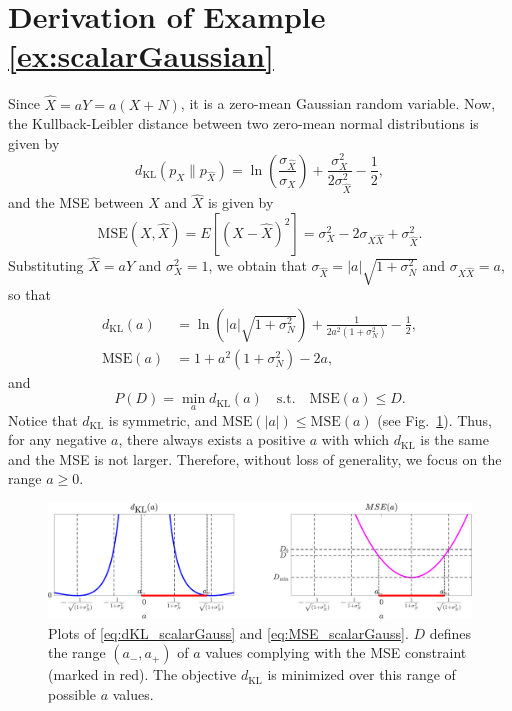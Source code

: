 \section{Derivation of Example \ref{ex:scalarGaussian}}\label{ap:scalarGaussian}
Since $\hat{X} = aY = a(X+N)$, it is a zero-mean Gaussian random variable. Now, the Kullback-Leibler distance between two zero-mean normal distributions is given by
\begin{equation}
d_{\text{KL}}(p_X\|p_{\hat{X}}) = \ln \left( \frac{\sigma_{\hat{X}}}{\sigma_X} \right) + \frac{\sigma_X^2}{2\sigma_{\hat{X}}^2} - \frac{1}{2},
\end{equation}
and the MSE between $X$ and $\hat{X}$ is given by
\begin{equation}
\text{MSE}(X,\hat{X}) = E[(X-\hat{X})^2]=\sigma_X^2-2\sigma_{X\hat{X}}+\sigma_{\hat{X}}^2.
\end{equation}
Substituting $\hat{X}=aY$ and $\sigma_X^2=1$, we obtain that $\sigma_{\hat{X}}=|a|\sqrt{1 + \sigma_N^2}$ and $\sigma_{X\hat{X}}=a$, so that
\begin{align}
d_{\text{KL}}(a) &= \ln \left( |a|\sqrt{1 + \sigma_N^2} \right) + \frac{1}{2a^2(1 + \sigma_N^2)} - \frac{1}{2}, \label{eq:dKL_scalarGauss}\\
\text{MSE}(a) &= 1+a^2(1 + \sigma_N^2)-2a,\label{eq:MSE_scalarGauss}
\end{align}
and
\begin{equation}\label{eq:fAlphaScalarGaussian}
P(D) = \min_{a} d_{\text{KL}}(a)
\quad\text{s.t.}\quad  \text{MSE}(a) \le D.
\end{equation}
Notice that $d_{\text{KL}}$ is symmetric, and $\text{MSE}(|a|) \le \text{MSE}(a)$ (see Fig.~\ref{fig:dKL_MSE}). Thus, for any negative $a$, there always exists a positive $a$ with which $d_{\text{KL}}$ is the same and the MSE is not larger. Therefore, without loss of generality, we focus on the range $a\ge0$.

\begin{figure}
	\begin{center}
		\includegraphics[width=\linewidth]{supp_figures/dKL_MSE.pdf}
	\end{center}
	\caption{Plots of \eqref{eq:dKL_scalarGauss} and \eqref{eq:MSE_scalarGauss}. $D$ defines the range $(a_-,a_+)$ of $a$ values complying with the MSE constraint (marked in red). The objective $d_{\text{KL}}$ is minimized over this range of possible $a$ values.}
	\label{fig:dKL_MSE}
\end{figure}

